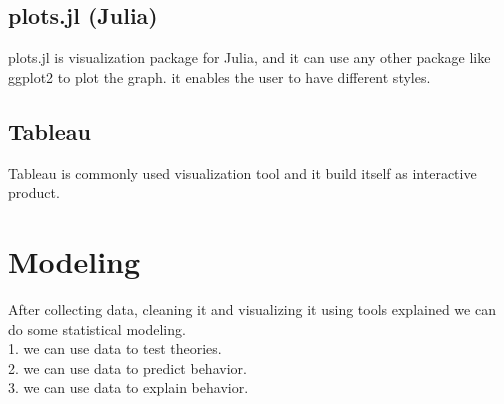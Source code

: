 \documentclass{article}
\begin{document}
\subsection{plots.jl (Julia)}
plots.jl is visualization package for Julia, and it can use any other package like ggplot2 to plot the graph. it enables the user to have different styles.
\subsection{Tableau}
Tableau is commonly used visualization tool and it build itself as interactive product.
\section{Modeling}
After collecting data, cleaning it and visualizing it using tools explained we can do some statistical modeling.\\
1. we can use data to test theories.\\
2. we can use data to predict behavior.\\
3. we can use data to explain behavior.\\
\end{document}
